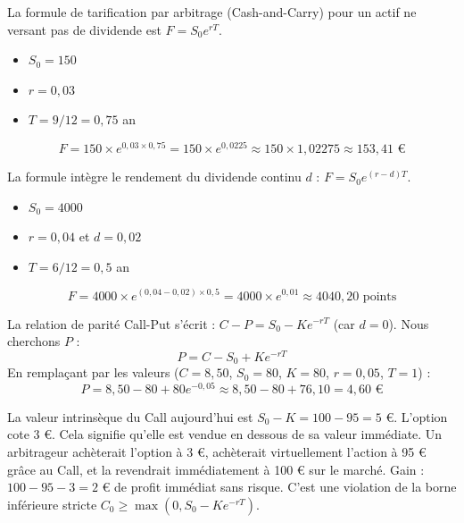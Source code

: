 \begin{correctionbox}
La formule de tarification par arbitrage (Cash-and-Carry) pour un actif ne versant pas de dividende est $F = S_0 e^{rT}$.
\begin{itemize}[label=$\cdot$]
    \item $S_0 = 150$
    \item $r = 0,03$
    \item $T = 9/12 = 0,75$ an
\end{itemize}
\begin{equation*}
    F = 150 \times e^{0,03 \times 0,75} = 150 \times e^{0,0225} \approx 150 \times 1,02275 \approx 153,41 \text{ €}
\end{equation*}
\end{correctionbox}

\begin{correctionbox}
La formule intègre le rendement du dividende continu $d$ : $F = S_0 e^{(r-d)T}$.
\begin{itemize}[label=$\cdot$]
    \item $S_0 = 4 000$
    \item $r = 0,04$ et $d = 0,02$
    \item $T = 6/12 = 0,5$ an
\end{itemize}
\begin{equation*}
    F = 4 000 \times e^{(0,04 - 0,02) \times 0,5} = 4 000 \times e^{0,01} \approx 4 040,20 \text{ points}
\end{equation*}
\end{correctionbox}

\begin{correctionbox}
La relation de parité Call-Put s'écrit : $C - P = S_0 - K e^{-rT}$ (car $d=0$).
Nous cherchons $P$ :
\begin{equation*}
    P = C - S_0 + K e^{-rT}
\end{equation*}
En remplaçant par les valeurs ($C=8,50$, $S_0=80$, $K=80$, $r=0,05$, $T=1$) :
\begin{equation*}
    P = 8,50 - 80 + 80 e^{-0,05} \approx 8,50 - 80 + 76,10 = 4,60 \text{ €}
\end{equation*}
\end{correctionbox}

\begin{correctionbox}
La valeur intrinsèque du Call aujourd'hui est $S_0 - K = 100 - 95 = 5$ €.
L'option cote 3 €. Cela signifie qu'elle est vendue en dessous de sa valeur immédiate.
Un arbitrageur achèterait l'option à 3 €, achèterait virtuellement l'action à 95 € grâce au Call, et la revendrait immédiatement à 100 € sur le marché.
Gain : $100 - 95 - 3 = 2$ € de profit immédiat sans risque. C'est une violation de la borne inférieure stricte $C_0 \ge \max(0, S_0 - K e^{-rT})$.
\end{correctionbox}

